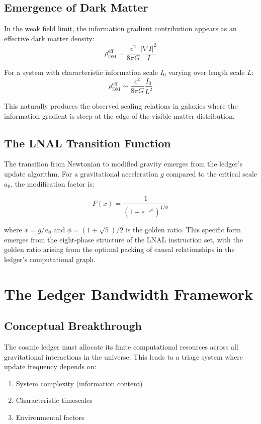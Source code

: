 \documentclass[12pt]{article}
\begin{document}
\subsection{Emergence of Dark Matter}

In the weak field limit, the information gradient contribution appears as an effective dark matter density:
\begin{equation}
\rho_{\text{DM}}^{\text{eff}} = \frac{c^2}{8\pi G} \frac{|\nabla I|^2}{I}
\end{equation}

For a system with characteristic information scale $I_0$ varying over length scale $L$:
\begin{equation}
\rho_{\text{DM}}^{\text{eff}} \sim \frac{c^2}{8\pi G} \frac{I_0}{L^2}
\end{equation}

This naturally produces the observed scaling relations in galaxies where the information gradient is steep at the edge of the visible matter distribution.

\subsection{The LNAL Transition Function}

The transition from Newtonian to modified gravity emerges from the ledger's update algorithm. For a gravitational acceleration $g$ compared to the critical scale $a_0$, the modification factor is:

\begin{equation}
F(x) = \frac{1}{(1 + e^{-x^\phi})^{1/\phi}}
\end{equation}

where $x = g/a_0$ and $\phi = (1+\sqrt{5})/2$ is the golden ratio. This specific form emerges from the eight-phase structure of the LNAL instruction set, with the golden ratio arising from the optimal packing of causal relationships in the ledger's computational graph.

\section{The Ledger Bandwidth Framework}

\subsection{Conceptual Breakthrough}

The cosmic ledger must allocate its finite computational resources across all gravitational interactions in the universe. This leads to a triage system where update frequency depends on:
\begin{enumerate}
\item System complexity (information content)
\item Characteristic timescales
\item Environmental factors
\end{enumerate}
\end{document}

